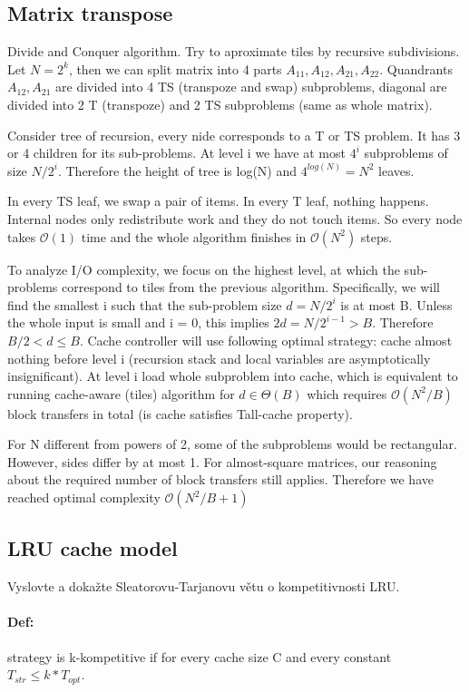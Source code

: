 \documentclass[12pt]{article}
\newcommand{\bigO}{\mathcal{O}}
\begin{document}
\subsection{Matrix transpose}
Divide and Conquer algorithm. Try to aproximate tiles by recursive subdivisions. Let $N = 2^k$, then we can split matrix into 4 parts $A_{11}, A_{12}, A_{21}, A_{22}$. Quandrants $ A_{12}, A_{21} $ are divided into 4 TS (transpoze and swap) subproblems, diagonal are divided into 2 T (transpoze) and 2 TS subproblems (same as whole matrix).

Consider tree of recursion, every nide corresponds to a T or TS problem. It has 3 or 4 children for its sub-problems. At level i we have at most $ 4^i $ subproblems of size $ N/2^i $. Therefore the height of tree is log(N) and $ 4^{log(N)} = N^2 $ leaves.

In every TS leaf, we swap a pair of items. In every T leaf, nothing happens. Internal nodes only redistribute work and they do not touch items. So every node takes $ \bigO(1) $ time and the whole algorithm finishes in $ \bigO(N^2) $ steps.

To analyze I/O complexity, we focus on the highest level, at which the sub-problems correspond to tiles from the previous algorithm. Specifically, we will find the smallest i such that the sub-problem size $ d = N/2^i $ is at most B. Unless the whole input is small
and i = 0, this implies $ 2d = N/2^{i-1} > B$. Therefore $ B/2 < d \leq B$. Cache controller will use following optimal strategy: cache almost nothing before level i (recursion stack and local variables are asymptotically insignificant). At level i load whole subproblem into cache, which is equivalent to running cache-aware (tiles) algorithm for $ d \in \Theta(B) $ which requires $ \bigO(N^2/B) $ block transfers in total (is cache satisfies Tall-cache property).

For N different from powers of 2, some of the subproblems would be rectangular. However, sides differ by at most 1.  For almost-square matrices, our reasoning about the required number of block transfers still applies. Therefore we have reached optimal complexity $ \bigO(N^2/B + 1) $

\subsection{LRU cache model}

    Vyslovte a dokažte Sleatorovu-Tarjanovu větu o kompetitivnosti LRU.

\paragraph{Def:} strategy is k-kompetitive if for every cache size C and every constant $T_{str} \leq k * T_{opt}$.
\end{document}
